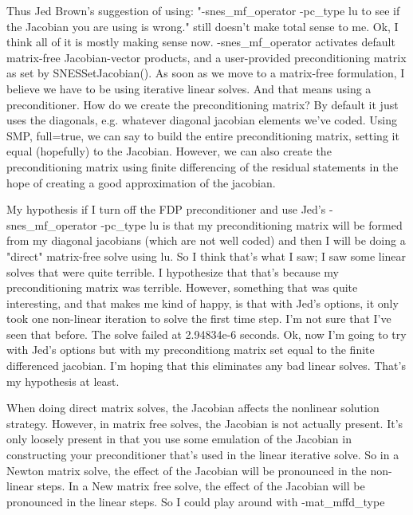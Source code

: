 Thus Jed Brown's suggestion of using: "-snes_mf_operator -pc_type lu to see if the Jacobian you are
using is wrong." still doesn't make total sense to me. Ok, I think all of it is mostly making sense now. -snes_mf_operator activates default matrix-free Jacobian-vector products, and a user-provided preconditioning matrix as set by SNESSetJacobian(). As soon as we move to a matrix-free formulation, I believe we have to be using iterative linear solves. And that means using a preconditioner. How do we create the preconditioning matrix? By default it just uses the diagonals, e.g. whatever diagonal jacobian elements we've coded. Using SMP, full=true, we can say to build the entire preconditioning matrix, setting it equal (hopefully) to the Jacobian. However, we can also create the preconditioning matrix using finite differencing of the residual statements in the hope of creating a good approximation of the jacobian.

My hypothesis if I turn off the FDP preconditioner and use Jed's -snes_mf_operator -pc_type lu is that my preconditioning matrix will be formed from my diagonal jacobians (which are not well coded) and then I will be doing a "direct" matrix-free solve using lu. So I think that's what I saw; I saw some linear solves that were quite terrible. I hypothesize that that's because my preconditioning matrix was terrible. However, something that was quite interesting, and that makes me kind of happy, is that with Jed's options, it only took one non-linear iteration to solve the first time step. I'm not sure that I've seen that before. The solve failed at 2.94834e-6 seconds. Ok, now I'm going to try with Jed's options but with my preconditiong matrix set equal to the finite differenced jacobian. I'm hoping that this eliminates any bad linear solves. That's my hypothesis at least.

When doing direct matrix solves, the Jacobian affects the nonlinear solution strategy. However, in matrix free solves, the Jacobian is not actually present. It's only loosely present in that you use some emulation of the Jacobian in constructing your preconditioner that's used in the linear iterative solve. So in a Newton matrix solve, the effect of the Jacobian will be pronounced in the non-linear steps. In a New matrix free solve, the effect of the Jacobian will be pronounced in the linear steps. So I could play around with -mat_mffd_type

